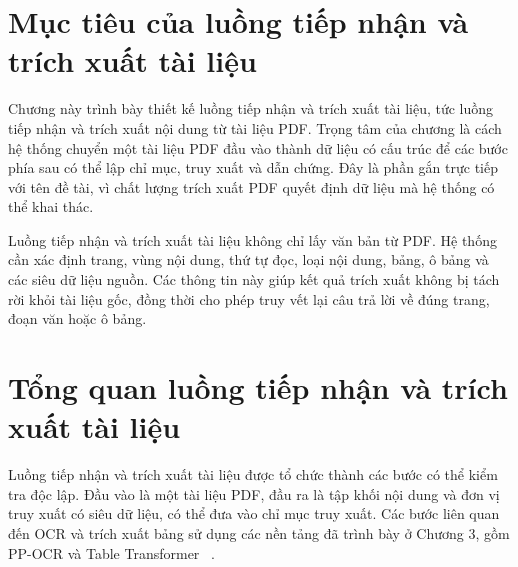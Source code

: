 \documentclass[../DoAn.tex]{subfiles}
\begin{document}
\section{Mục tiêu của luồng tiếp nhận và trích xuất tài liệu}
\label{section:chapter4-ingest-goal}

Chương này trình bày thiết kế luồng tiếp nhận và trích xuất tài liệu, tức luồng tiếp nhận và trích xuất nội
dung từ tài liệu PDF. Trọng tâm của chương là cách hệ thống chuyển một tài liệu
PDF đầu vào thành dữ liệu có cấu trúc để các bước phía sau có thể lập chỉ mục,
truy xuất và dẫn chứng. Đây là phần gắn trực tiếp với tên đề tài, vì chất lượng
trích xuất PDF quyết định dữ liệu mà hệ thống có thể khai thác.

Luồng tiếp nhận và trích xuất tài liệu không chỉ lấy văn bản từ PDF. Hệ thống cần xác định trang, vùng nội
dung, thứ tự đọc, loại nội dung, bảng, ô bảng và các siêu dữ liệu nguồn. Các thông tin
này giúp kết quả trích xuất không bị tách rời khỏi tài liệu gốc, đồng thời cho phép
truy vết lại câu trả lời về đúng trang, đoạn văn hoặc ô bảng.

\section{Tổng quan luồng tiếp nhận và trích xuất tài liệu}
\label{section:ingest-flow-overview}

Luồng tiếp nhận và trích xuất tài liệu được tổ chức thành các bước có thể kiểm tra độc lập. Đầu vào là
một tài liệu PDF, đầu ra là tập khối nội dung và đơn vị truy xuất có siêu dữ liệu, có thể đưa vào chỉ mục
truy xuất. Các bước liên quan đến OCR và trích xuất bảng sử dụng các nền tảng
đã trình bày ở Chương 3, gồm PP-OCR và Table Transformer~
\cite{du2020ppocr,smock2022pubtables}.
\end{document}
